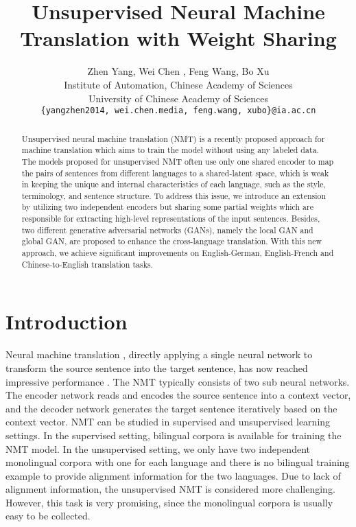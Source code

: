 \documentclass[11pt,a4paper]{article}
\title{Unsupervised Neural Machine Translation with Weight Sharing}
\author{Zhen Yang,  Wei Chen  ,  Feng Wang\footnotemark[1], Bo Xu \\
  Institute of Automation, Chinese Academy of Sciences \\
  University of Chinese Academy of Sciences \\
  {\tt \{yangzhen2014, wei.chen.media, feng.wang, xubo\}@ia.ac.cn}}
\date{}
\begin{document}
\maketitle
{}

\begin{abstract}
Unsupervised neural machine translation (NMT) is a recently proposed approach for machine translation which aims to train the model without using any labeled data. The models proposed for unsupervised NMT often use only one shared encoder to map the pairs of sentences from different languages to a shared-latent space, which is weak in keeping the unique and internal characteristics of each language, such as the style, terminology, and sentence structure. To address this issue, we introduce an extension by utilizing two independent encoders but sharing some partial weights which are responsible for extracting high-level representations of the input sentences. Besides, two different generative adversarial networks (GANs), namely the local GAN and global GAN, are proposed to enhance the cross-language translation. With this new approach, we achieve significant improvements on English-German, English-French and Chinese-to-English translation tasks.
\end{abstract}

\section{Introduction}
Neural machine translation \cite{Kalchbrenner:13,sutskever:14,cho:14b,bahdanau:14}, directly applying a single neural network to transform the source sentence into the target sentence, has now reached impressive performance \cite{shen:15,wu2016google,johnson2016google,Gehring2017Convolutional,Vaswani2017Attention}. The NMT typically consists of two sub neural networks. The encoder network reads and encodes the source sentence into a context vector, and the decoder network generates the target sentence iteratively based on the context vector. NMT can be studied in supervised and unsupervised learning settings. In the supervised setting, bilingual corpora is available for training the NMT model. In the unsupervised setting, we only have two independent monolingual corpora with one for each language and there is no bilingual training example to provide alignment information for the two languages. Due to lack of alignment information, the unsupervised NMT is considered more challenging. However, this task is very promising, since the monolingual corpora is usually easy to be collected.
\end{document}
